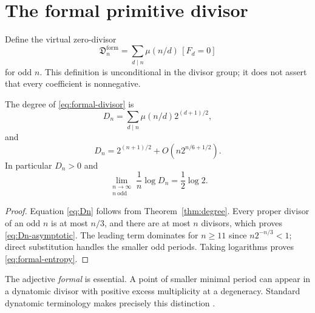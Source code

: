 \section{The formal primitive divisor}

Define the virtual zero-divisor
\begin{equation}\label{eq:formal-divisor}
\mathfrak D_n^{\mathrm{form}}
=\sum_{d\mid n}\mu(n/d)\,[F_d=0]
\end{equation}
for odd $n$.  This definition is unconditional in the divisor group; it does
not assert that every coefficient is nonnegative.

\begin{theorem}\label{thm:formal}
The degree of \eqref{eq:formal-divisor} is
\begin{equation}\label{eq:Dn}
D_n=\sum_{d\mid n}\mu(n/d)2^{(d+1)/2},
\end{equation}
and
\begin{equation}\label{eq:Dn-asymptotic}
D_n=2^{(n+1)/2}+O(n2^{n/6+1/2}).
\end{equation}
In particular $D_n>0$ and
\begin{equation}\label{eq:formal-entropy}
\lim_{\substack{n\to\infty\\ n\ \mathrm{odd}}}\frac1n\log D_n
=\frac12\log2.
\end{equation}
\end{theorem}

\begin{proof}
Equation \eqref{eq:Dn} follows from Theorem~\ref{thm:degree}.  Every proper
divisor of an odd $n$ is at most $n/3$, and there are at most $n$ divisors,
which proves \eqref{eq:Dn-asymptotic}.  The leading term dominates for
$n\ge11$ since $n2^{-n/3}<1$; direct substitution handles the smaller odd
periods.  Taking logarithms proves \eqref{eq:formal-entropy}.
\end{proof}

The adjective \emph{formal} is essential.  A point of smaller minimal period
can appear in a dynatomic divisor with positive excess multiplicity at a
degeneracy.  Standard dynatomic terminology makes precisely this distinction
\citep{MortonSilverman1994,Hutz2010}.
